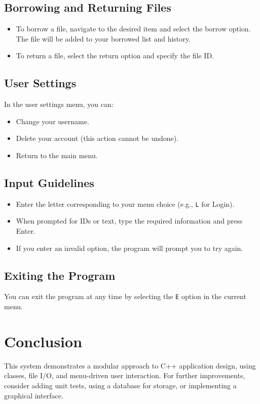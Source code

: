 \documentclass[a4paper,12pt]{article}
\begin{document}
\subsection{Borrowing and Returning Files}
\begin{itemize}
    \item To borrow a file, navigate to the desired item and select the borrow option. The file will be added to your borrowed list and history.
    \item To return a file, select the return option and specify the file ID.
\end{itemize}

\subsection{User Settings}
In the user settings menu, you can:
\begin{itemize}
    \item Change your username.
    \item Delete your account (this action cannot be undone).
    \item Return to the main menu.
\end{itemize}

\subsection{Input Guidelines}
\begin{itemize}
    \item Enter the letter corresponding to your menu choice (e.g., \texttt{L} for Login).
    \item When prompted for IDs or text, type the required information and press Enter.
    \item If you enter an invalid option, the program will prompt you to try again.
\end{itemize}

\subsection{Exiting the Program}
You can exit the program at any time by selecting the \texttt{E} option in the current menu.

\section{Conclusion}
This system demonstrates a modular approach to C++ application design, using classes, file I/O, and menu-driven user interaction. For further improvements, consider adding unit tests, using a database for storage, or implementing a graphical interface.
\end{document}
